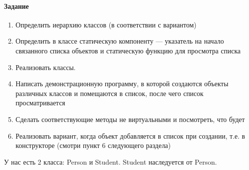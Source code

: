 \paragraph{Задание}
\begin{enumerate}
    \item Определить иерархию классов (в соответствии с вариантом)
    \item Определить в классе статическую компоненту --- указатель на начало связанного списка объектов и статическую функцию для просмотра списка
    \item Реализовать классы.
    \item Написать демонстрационную программу, в которой создаются объекты различных классов и помещаются в список, после чего список просматривается
    \item Сделать соответствующие методы не виртуальными и посмотреть, что будет
    \item Реализовать вариант, когда объект добавляется в список при создании, т.е. в конструкторе (смотри пункт 6 следующего раздела)
\end{enumerate}
У нас есть 2 класса: Person и Student.
Student наследуется от Person.







